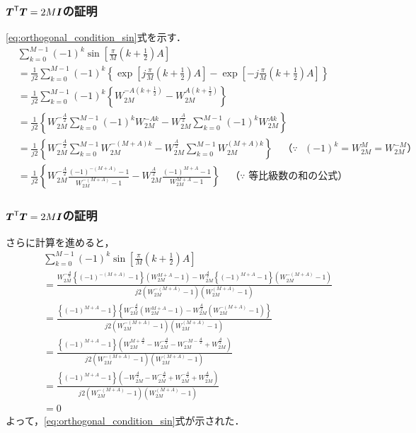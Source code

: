 \documentclass[14pt,xcolor=dvipsnames,table,dvipdfmx]{beamer}
\begin{document}
\begin{frame}[c]
    \frametitle{$\boldsymbol{T}^{\mathsf{T}} \boldsymbol{T} = 2M\boldsymbol{I}$の証明}
    \eqref{eq:orthogonal_condition_sin}式を示す．
    \scriptsize
    \begin{align*}
        & \sum_{k = 0}^{M - 1} (-1)^{k} \sin\left[ \frac{\pi}{M} \left( k + \frac{1}{2} \right) A  \right] \\
        &= \frac{1}{j2} \sum_{k = 0}^{M - 1} (-1)^{k} \left\{ \exp\left[ j \frac{\pi}{M} \left( k + \frac{1}{2} \right) A  \right] - \exp\left[ -j \frac{\pi}{M} \left( k + \frac{1}{2} \right) A  \right] \right\} \\
        &= \frac{1}{j2} \sum_{k = 0}^{M - 1} (-1)^{k} \left\{ W_{2M}^{-A\left( k + \frac{1}{2} \right)} - W_{2M}^{A\left( k + \frac{1}{2} \right)} \right\} \\
        &= \frac{1}{j2} \left\{ W_{2M}^{-\frac{A}{2}} \sum_{k = 0}^{M - 1} (-1)^{k} W_{2M}^{-Ak} - W_{2M}^{\frac{A}{2}} \sum_{k = 0}^{M - 1} (-1)^{k} W_{2M}^{Ak} \right\} \\
        &= \frac{1}{j2} \left\{ W_{2M}^{-\frac{A}{2}} \sum_{k = 0}^{M - 1} W_{2M}^{-(M + A)k} - W_{2M}^{\frac{A}{2}} \sum_{k = 0}^{M - 1} W_{2M}^{(M + A)k} \right\} \quad \text{（$\because$ $(-1)^{k} = W_{2M}^{M} = W_{2M}^{-M}$）} \\
        &= \frac{1}{j2} \left\{ W_{2M}^{-\frac{A}{2}} \frac{(-1)^{-(M + A)} - 1}{W_{2M}^{-(M + A)} - 1} - W_{2M}^{\frac{A}{2}} \frac{(-1)^{M + A} - 1}{W_{2M}^{M + A} - 1} \right\} \quad \text{（$\because$ 等比級数の和の公式）}
    \end{align*}
\end{frame}

\begin{frame}[c]
    \frametitle{$\boldsymbol{T}^{\mathsf{T}} \boldsymbol{T} = 2M\boldsymbol{I}$の証明}
    さらに計算を進めると，
    \scriptsize
    \begin{align*}
        & \sum_{k = 0}^{M - 1} (-1)^{k} \sin\left[ \frac{\pi}{M} \left( k + \frac{1}{2} \right) A \right] \\
        &= \frac{W_{2M}^{-\frac{A}{2}} \left\{ (-1)^{-(M + A)} - 1 \right\} (W_{2M}^{M + A} - 1) - W_{2M}^{\frac{A}{2}} \left\{ (-1)^{M + A} - 1 \right\} (W_{2M}^{-(M + A)} - 1)}{j2(W_{2M}^{-(M + A)} - 1)(W_{2M}^{(M + A)} - 1)} \\
        &= \frac{\left\{(-1)^{M + A} - 1 \right\}\left\{ W_{2M}^{-\frac{A}{2}} ( W_{2M}^{M + A} - 1 ) - W_{2M}^{\frac{A}{2}} ( W_{2M}^{-(M + A)} - 1 )\right\}}{j2(W_{2M}^{-(M + A)} - 1)(W_{2M}^{(M + A)} - 1)} \\
        &= \frac{\left\{(-1)^{M + A} - 1 \right\}\left( W_{2M}^{M + \frac{A}{2}} - W_{2M}^{-\frac{A}{2}} - W_{2M}^{-M - \frac{A}{2}} + W_{2M}^{\frac{A}{2}} \right)}{j2(W_{2M}^{-(M + A)} - 1)(W_{2M}^{(M + A)} - 1)} \\
        &= \frac{\left\{(-1)^{M + A} - 1 \right\}\left( -W_{2M}^{\frac{A}{2}} - W_{2M}^{-\frac{A}{2}} + W_{2M}^{-\frac{A}{2}} + W_{2M}^{\frac{A}{2}} \right)}{j2(W_{2M}^{-(M + A)} - 1)(W_{2M}^{(M + A)} - 1)} \\
        &= 0
    \end{align*}
    \normalsize
    よって，\eqref{eq:orthogonal_condition_sin}式が示された．
\end{frame}
\end{document}
